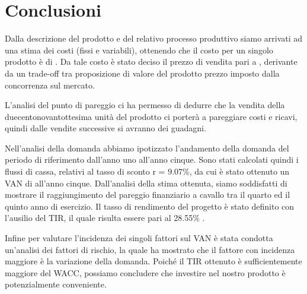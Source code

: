 \section{Conclusioni}
Dalla descrizione del prodotto e del relativo processo produttivo siamo arrivati
ad una stima dei costi (fissi e variabili), ottenendo che il costo per un
singolo prodotto è di . Da tale costo è stato deciso il prezzo di
vendita pari a , derivante da un trade-off tra proposizione di
valore del prodotto prezzo imposto dalla concorrenza sul mercato.

L’analisi del punto di pareggio ci ha permesso di dedurre che la vendita della
duecentonovantottesima unità del prodotto ci porterà a pareggiare costi e
ricavi, quindi dalle vendite successive si avranno dei guadagni.

Nell’analisi della domanda abbiamo ipotizzato l’andamento della domanda del
periodo di riferimento dall’anno uno all’anno cinque. Sono stati calcolati
quindi i flussi di cassa, relativi al tasso di sconto r = 9.07\%, da cui è stato
ottenuto un VAN di   all’anno cinque. Dall’analisi della stima
ottenuta, siamo soddisfatti di mostrare il raggiungimento del pareggio
finanziario a cavallo tra il quarto ed il quinto anno di esercizio.  Il tasso di
rendimento del progetto è stato definito con l’ausilio del TIR, il quale risulta
essere pari al 28.55\% .

Infine per valutare l’incidenza dei singoli fattori sul VAN è stata condotta
un’analisi dei fattori di rischio, la quale ha mostrato che il fattore con incidenza
maggiore è la variazione della domanda.  Poiché il TIR ottenuto è
sufficientemente maggiore del WACC, possiamo concludere che investire nel nostro
prodotto è potenzialmente conveniente.

